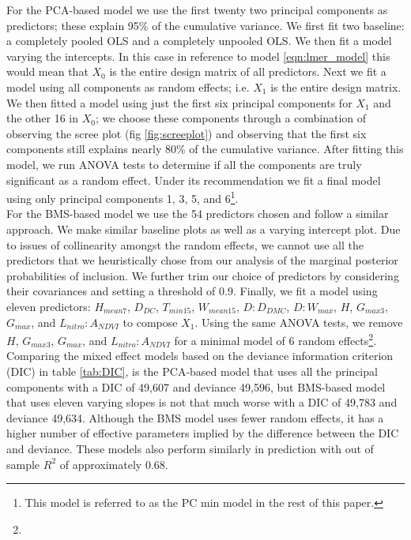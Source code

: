 \documentclass[twocolumn,10pt]{article}
\begin{document}
For the PCA-based model we use the first twenty two principal components as predictors; these explain 95\% of the cumulative variance. We first fit two baseline: a completely pooled OLS and a completely unpooled OLS. We then fit a model varying the intercepts. In this case in reference to model \ref{eqn:lmer_model} this would mean that $X_{0}$ is the entire design matrix of all predictors. Next we fit a model using all components as random effects; i.e. $X_{1}$ is the entire design matrix. We then fitted a model using just the first six principal components for $X_{1}$ and the other 16 in $X_{0}$; we choose these components through a combination of observing the scree plot (fig \ref{fig:screeplot}) and observing that the first six components still explains nearly 80\% of the cumulative variance. After fitting this model, we run ANOVA tests to determine if all the components are truly significant as a random effect. Under its recommendation we fit a final model using only principal components 1, 3, 5, and 6\footnote{This model is referred to as the PC min model in the rest of this paper.}. \\

For the BMS-based model we use the 54 predictors chosen and follow a similar approach. We make similar baseline plots as well as a varying intercept plot. Due to issues of collinearity amongst the random effects, we cannot use all the predictors that we heuristically chose from our analysis of the marginal posterior probabilities of inclusion. We further trim our choice of predictors by considering their covariances and setting a threshold of 0.9. Finally, we fit a model using eleven predictors: $H_{mean7}$, $D_{DC}$, $T_{min15}$, $W_{mean15}$, $D:D_{DMC}$, $D:W_{max}$, $H$, $G_{max3}$, $G_{max}$, and $L_{nitro}:A_{NDVI}$ to compose $X_{1}$. Using the same ANOVA tests, we remove $H$, $G_{max3}$, $G_{max}$, and $L_{nitro}:A_{NDVI}$ for a minimal model of 6 random effects\footnote{}. \\

Comparing the mixed effect models based on the deviance information criterion (DIC) in table \ref{tab:DIC}, is the PCA-based model that uses all the principal components with a DIC of 49,607 and deviance 49,596, but BMS-based model that uses eleven varying slopes is not that much worse with a DIC of 49,783 and deviance 49,634. Although the BMS model uses fewer random effects, it has a higher number of effective parameters implied by the difference between the DIC and deviance. These models also perform similarly in prediction with out of sample $R^{2}$ of approximately 0.68. \\
\end{document}
